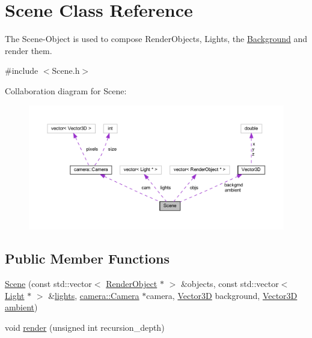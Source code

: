 \hypertarget{classScene}{}\section{Scene Class Reference}
\label{classScene}


The Scene-\/\+Object is used to compose Render\+Objects, Lights, the \mbox{\hyperlink{classBackground}{Background}} and render them.  




{\ttfamily \#include $<$Scene.\+h$>$}



Collaboration diagram for Scene\+:
\nopagebreak
\begin{figure}[H]
\begin{center}
\leavevmode
\includegraphics[width=350pt]{classScene__coll__graph}
\end{center}
\end{figure}
\subsection*{Public Member Functions}
\begin{DoxyCompactItemize}
\item 
\mbox{\hyperlink{classScene_aa05f285f7a7df49c03ce32fb1c43c9ae}{Scene}} (const std\+::vector$<$ \mbox{\hyperlink{classRenderObject}{Render\+Object}} $\ast$ $>$ \&objects, const std\+::vector$<$ \mbox{\hyperlink{classLight}{Light}} $\ast$ $>$ \&\mbox{\hyperlink{classScene_a4ecc3182a80435e1c4dfbe1b20e559bd}{lights}}, \mbox{\hyperlink{classcamera_1_1Camera}{camera\+::\+Camera}} $\ast$camera, \mbox{\hyperlink{classVector3D}{Vector3D}} background, \mbox{\hyperlink{classVector3D}{Vector3D}} \mbox{\hyperlink{classScene_a284ce5b2aeb47c64d6712d9748229c47}{ambient}})
\item 
void \mbox{\hyperlink{classScene_a19a594ba70c411fb6fddb1e9d772da52}{render}} (unsigned int recursion\+\_\+depth)
\end{DoxyCompactItemize}
